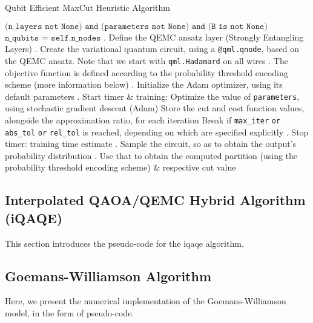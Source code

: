 \begin{algorithm}[H]
   \caption{Qubit Efficient MaxCut Heuristic Algorithm}\label{alg:QEMC}
   \begin{algorithmic}
   \Require $\texttt{(n\_layers not None) and (parameters not None) and (B is not None)}$ 
   \Ensure $\texttt{n\_qubits = self.n\_nodes}$
   . Define the QEMC ansatz layer (Strongly Entangling Layers)
   . Create the variational quantum circuit, using a \texttt{@qml.qnode}, based on the QEMC ansatz. Note that we start with \texttt{qml.Hadamard} on all wires
   . The objective function is defined according to the probability threshold encoding scheme (more information below)
   . Initialize the Adam optimizer, using its default parameters
   . Start timer \& training:
    Optimize the value of \texttt{parameters}, using stochastic gradient descent (Adam)
    Store the cut and cost function values, alongside the approximation ratio, for each iteration
    Break if \texttt{max\_iter} \texttt{or} \texttt{abs\_tol} \texttt{or} \texttt{rel\_tol} is reached, depending on which are specified explicitly
   \EndWhile
   . Stop timer: training time estimate
   . Sample the circuit, so as to obtain the output's probability distribution
   . Use that to obtain the computed partition (using the probability threshold encoding scheme) \& respective cut value
   \end{algorithmic}
\end{algorithm}


\subsection{Interpolated QAOA/QEMC Hybrid Algorithm (iQAQE)}
\label{subsection:iQAQE_Implementation}

This section introduces the pseudo-code for the \acrshort{iqaqe} algorithm.

\subsection{Goemans-Williamson Algorithm}
\label{subsection:Goemans_Williamson_Implementation}

Here, we present the numerical implementation of the Goemans-Williamson model, in the form of pseudo-code.

